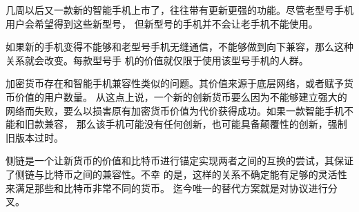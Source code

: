 \documentclass[letterpaper]{article}
\begin{document}
几周以后又一款新的智能手机上市了，往往带有更新更强的功能。尽管老型号手机用户会希望得到这些新型号，
但新型号的手机并不会让老手机不能使用。

如果新的手机变得不能够和老型号手机无缝通信，不能够做到向下兼容，那么这种关系就会改变。每款型号手
机的价值就仅限于使用该型号手机的人群。

加密货币存在和智能手机兼容性类似的问题。其价值来源于底层网络，或者赋予货币价值的用户数量。
从这点上说，一个新的创新货币要么因为不能够建立强大的网络而失败，要么以损害原有加密货币价值为代价获得成功。如果一款智能手机不能和旧款兼容，
那么该手机可能没有任何创新，也可能具备颠覆性的创新，强制旧版本过时。


侧链是一个让新货币的价值和比特币进行锚定实现两者之间的互换的尝试，其保证了侧链与比特币之间的兼容性。不幸
的是，这样的关系不确定能有足够的灵活性来满足那些和比特币非常不同的货币。
迄今唯一的替代方案就是对协议进行分叉。

\end{document}
